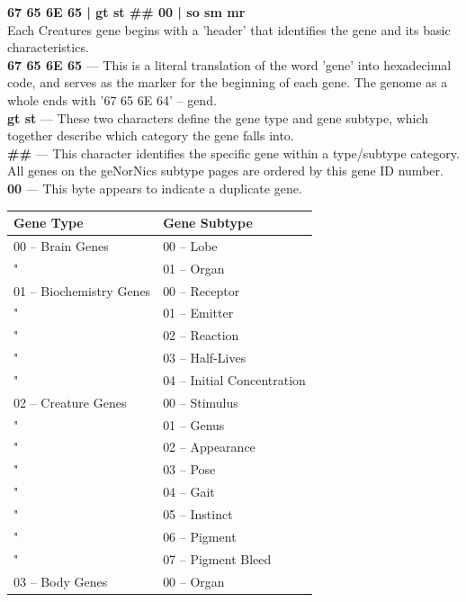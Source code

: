 \documentclass[11pt,twoside,a4paper]{article}
\begin{document}
\begin{minipage}[ht]{0.45\textwidth}
	\textbf{67 65 6E 65 | gt st \#\# 00 | so sm mr}~\\
	
	Each Creatures gene begins with a 'header' that identifies the gene and its basic characteristics. ~\\
	
	\textbf{67 65 6E 65} --- This is a literal translation of the word 'gene' into hexadecimal code, and serves as the marker for the beginning of each gene. The genome as a whole ends with '67 65 6E 64' -- gend. ~\\
	
	\textbf{gt st} --- These two characters define the gene type and gene subtype, which together describe which category the gene falls into. ~\\
	
	\textbf{\#\#} --- This character identifies the specific gene within a type/subtype category. All genes on the geNorNics subtype pages are ordered by this gene ID number. ~\\
	
	\textbf{00} --- This byte appears to indicate a duplicate gene. ~\\
\end{minipage} \hfill \begin{minipage}[ht]{0.50\textwidth}
	\begin{tabular}[c]{|p{4.50cm}|p{4.50cm}|}
		\hline
		\rowcolor{gray}
		\textbf{Gene Type}			&	\textbf{Gene Subtype}\\ \hline
		00 -- Brain Genes			&	00 -- Lobe			\\ \hline
		"							&	01 -- Organ			\\ \hline
		01 -- Biochemistry Genes	&	00 -- Receptor		\\ \hline
		"							&	01 -- Emitter		\\ \hline
		"							&	02 -- Reaction		\\ \hline
		"							&	03 -- Half-Lives	\\ \hline
		"							&	04 -- Initial Concentration	\\ \hline
		02 -- Creature Genes		&	00 -- Stimulus		\\ \hline
		"							&	01 -- Genus			\\ \hline
		"							&	02 -- Appearance	\\ \hline
		"							&	03 -- Pose			\\ \hline
		"							&	04 -- Gait			\\ \hline
		"							&	05 -- Instinct		\\ \hline
		"							&	06 -- Pigment		\\ \hline
		"							&	07 -- Pigment Bleed	\\ \hline
		03 -- Body Genes			&	00 -- Organ			\\ \hline
	\end{tabular} ~\\
\end{minipage}
\end{document}
